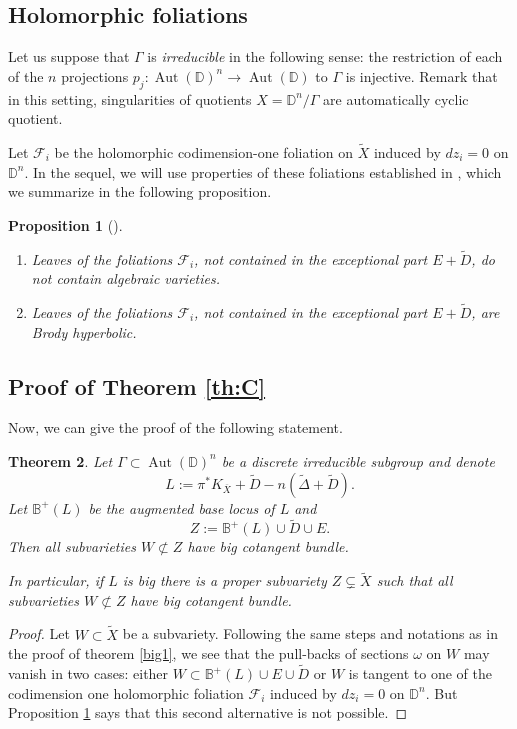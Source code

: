 \documentclass[10pt]{amsart}
\let\mathcal\mathscr
\theoremstyle{plain}
\newtheorem{theorem}{Theorem}[section]
\newtheorem{proposition}[theorem]{Proposition}
\theoremstyle{definition}
\numberwithin{equation}{theorem}
\newenvironment{enumerateth}
{\bgroup\def\theenumi{\thetheorem.\arabic{enumi}}
\begin{enumerate}
\setcounter{enumi}{\value{equation}}}
{\setcounter{equation}{\value{enumi}}
\end{enumerate}
\egroup}
\DeclareMathOperator{\Aut}{Aut}
\let\wtilde\widetilde
\newcommand\BB{\mathbb B}
\newcommand\DD{\mathbb D}
\providecommand{\skpt}{\par\smallskip\noindent}
\begin{document}
\subsection{Holomorphic foliations}

Let us suppose that $\Gamma$ is \emph{irreducible} in the following sense:
the restriction of each of the $n$ projections $p_j: \Aut(\DD)^n \to \Aut(\DD)$ to $\Gamma$ is injective. Remark that in this setting, singularities of quotients $X=\DD^n/\Gamma$ are automatically cyclic quotient.

Let $\mathcal{F}_i$ be the holomorphic codimension-one foliation on $\widetilde{X}$ induced by $dz_i=0$ on $\DD^n$. In the sequel, we will use properties of these foliations established in \cite{RT}, which we summarize in the following proposition.

\skpt
\begin{proposition}[\cite{RT}]\label{fol}
\begin{enumerateth}
\item Leaves of the foliations $\mathcal{F}_i$, not contained in the exceptional part $E+\wtilde{D}$, do not contain algebraic varieties.
\item Leaves of the foliations $\mathcal{F}_i$, not contained in the exceptional part $E+\wtilde{D}$, are Brody hyperbolic.
\end{enumerateth}
\end{proposition}

\subsection{Proof of Theorem \ref{th:C}}
Now, we can give the proof of the following statement.

\begin{theorem}\label{polydisc}
Let $\Gamma \subset \Aut(\DD)^n$ be a discrete irreducible subgroup and denote $$L:=\pi^*K_{\overline{X}}+\wtilde{D}-n(\wtilde {\Delta} + \widetilde{D}).$$
Let $\BB^+(L)$ be the augmented base locus of $L$ and $$Z:=\BB^+(L) \cup \widetilde{D} \cup E.$$
Then all subvarieties $W \not \subset Z$ have big cotangent bundle.

In particular, if $L$ is big there is a proper subvariety $Z \subsetneq \widetilde{X}$ such that all subvarieties $W \not \subset Z$ have big cotangent bundle.
\end{theorem}

\begin{proof}
Let $W \subset \widetilde{X}$ be a subvariety.
Following the same steps and notations as in the proof of theorem \ref{big1}, we see that the pull-backs of sections $\omega$ on $W$ may vanish in two cases: either $W \subset \BB^+(L) \cup E \cup \widetilde{D}$ or $W$ is tangent to one of the codimension one holomorphic foliation $\mathcal{F}_i$ induced by $dz_i=0$ on $\DD^n$. But Proposition \ref{fol} says that this second alternative is not possible.
\end{proof}
\end{document}
